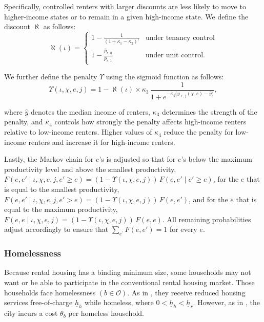 \documentclass[parskip=full]{article}
\begin{document}
Specifically, controlled renters with larger discounts are less likely to move to higher-income states or to remain in a given high-income state. We define the discount $\aleph$ as follows:
\begin{equation}\label{eq:discount}
\aleph(\iota)=\begin{cases}
1-\frac{1}{\left(1+\kappa_1-\kappa_2 \right)^{\iota}} & \text{under tenancy control} \\[8pt]
1-\frac{\hat{p}_{r,0}}{p_{r,1}} & \text{under unit control}.
\end{cases}
\end{equation}

We further define the penalty $\Upsilon$ using the sigmoid function as follows:
\begin{equation}\label{eq:penalty}
\Upsilon(\iota,\chi,e,j)=1-\aleph(\iota) \times  \kappa_3\,\frac{1}{1+e^{-\kappa_4\big( y_{\ell,j}(\chi,e)-\hat{y}\big)}},
\end{equation}

\noindent where $\hat{y}$ denotes the median income of renters, $\kappa_3$ determines the strength of the penalty, and $\kappa_4$ controls how strongly the penalty affects high-income renters relative to low-income renters. Higher values of $\kappa_4$ reduce the penalty for low-income renters and increase it for high-income renters.

Lastly, the Markov chain for $e$'s is adjusted so that for $e$'s below the maximum productivity level and above the smallest productivity, $F(e,e'\mid\iota,\chi,e,j,e'\geq e)=(1-\Upsilon(\iota,\chi,e,j))\,F(e,e'\mid e'\geq e)$, for the $e$ that is equal to the smallest productivity, $F(e,e'\mid\iota,\chi,e,j,e'>e)=(1-\Upsilon(\iota,\chi,e,j))\,F(e,e')$, and for the $e$ that is equal to the maximum productivity, $F(e,e\mid\iota,\chi,e,j)=(1-\Upsilon(\iota,\chi,e,j))\,F(e,e)$. All remaining probabilities adjust accordingly to ensure that $\sum_{e^{'}} F(e,e')=1$ for every $e$.

\subsubsection{Homelessness}\label{sec:cohabit_homeless}

Because rental housing has a binding minimum size, some households may not want or be able to participate in the conventional rental housing market. Those households face homelessness $\left(b \in \mathcal{O}\right)$. As in \citet{az-2024}, they receive reduced housing services free-of-charge $\underline{h}_{h}$ while homeless, where $0<\underline{h}_{h}<\underline{h}_{r}$. However, as in \citet{abramson-2024}, the city incurs a cost $\theta_{b}$ per homeless household. 
\end{document}
